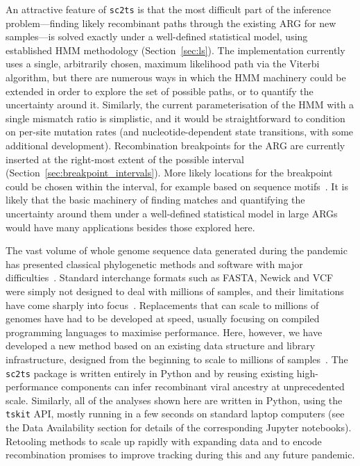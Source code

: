 \documentclass{article}
\begin{document}
An attractive feature of \texttt{sc2ts} is that the most difficult part of
the inference problem---finding likely recombinant paths through the existing ARG
for new samples---is solved exactly under a well-defined statistical model,
using established HMM methodology (Section~\ref{sec:ls}).
The implementation currently uses
a single, arbitrarily chosen, maximum likelihood path via the
Viterbi algorithm, but there are numerous ways in which the HMM machinery
could be extended in order to explore the set of possible paths, or to
quantify the uncertainty around it. Similarly, the current parameterisation
of the HMM with a single mismatch ratio is simplistic, and it would
be straightforward to condition on per-site mutation rates (and nucleotide-dependent
state transitions, with some additional development).
Recombination breakpoints for the ARG are currently inserted at the
right-most extent of the possible interval
(Section~\ref{sec:breakpoint_intervals}).
More likely locations for the
breakpoint could be chosen within the interval, for example based
on sequence motifs~\citep{Gallaher2020-mr, Yang2020-ct}.
It is likely that the basic machinery of finding matches and quantifying
the uncertainty around them under a well-defined statistical model
in large ARGs would have many applications besides those explored here.

The vast volume of whole genome sequence data generated during the pandemic
has presented classical phylogenetic methods and software with major
difficulties~\citep{Hodcroft2021-wt}.
Standard interchange formats such as FASTA, Newick and VCF were simply not designed
to deal with millions of samples, and their limitations have come sharply
into focus~\citep{Turakhia2021-ur,de2023maximum}.
Replacements that can scale to millions of genomes have had to be developed
at speed, usually focusing on compiled programming languages to maximise
performance. Here, however, we have developed a new method based on
an existing data structure and library infrastructure, designed
from the beginning to scale to millions of
samples~\citep{Kelleher2016-wk,Kelleher2019-ba}.
The \texttt{sc2ts} package is written entirely in Python
and by reusing existing high-performance components can infer
recombinant viral ancestry at unprecedented scale.
Similarly, all of the analyses shown here are written in Python,
using the \texttt{tskit} API, mostly running in a few seconds
on standard laptop computers (see the Data Availability
section for details of the corresponding Jupyter notebooks).
Retooling methods to scale up rapidly with expanding data and to encode recombination
promises to improve tracking during this and any future pandemic.
\end{document}
